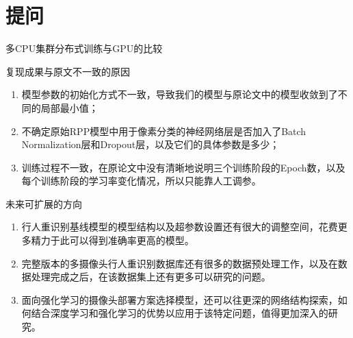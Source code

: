 \section{提问}

\begin{frame}{多CPU集群分布式训练与GPU的比较}
\end{frame}

\begin{frame}{复现成果与原文不一致的原因}
    \begin{block}

        \begin{enumerate}
            \item 模型参数的初始化方式不一致，导致我们的模型与原论文中的模型收敛到了不同的局部最小值；\\[0.8em]
            \item 不确定原始RPP模型中用于像素分类的神经网络层是否加入了Batch Normalization层和Dropout层，以及它们的具体参数是多少；\\[0.8em]
            \item 训练过程不一致，在原论文中没有清晰地说明三个训练阶段的Epoch数，以及每个训练阶段的学习率变化情况，所以只能靠人工调参。
        \end{enumerate}

    \end{block}
\end{frame}

\begin{frame}{未来可扩展的方向}
    \begin{block}

        \begin{enumerate}
            \item 行人重识别基线模型的模型结构以及超参数设置还有很大的调整空间，花费更多精力于此可以得到准确率更高的模型。\\[0.8em]
            \item 完整版本的多摄像头行人重识别数据库还有很多的数据预处理工作，以及在数据处理完成之后，在该数据集上还有更多可以研究的问题。\\[0.8em]
            \item 面向强化学习的摄像头部署方案选择模型，还可以往更深的网络结构探索，如何结合深度学习和强化学习的优势以应用于该特定问题，值得更加深入的研究。
        \end{enumerate}

    \end{block}
\end{frame}

